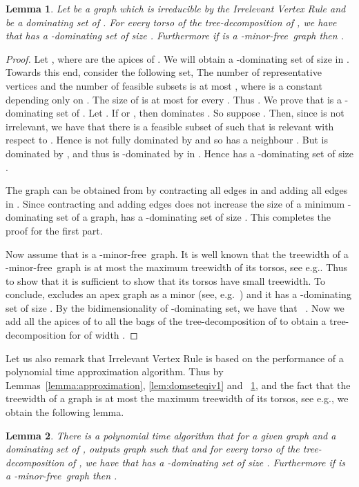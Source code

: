 \documentclass[11pt]{article}
\newtheorem{lemma}{Lemma}
\newcommand{\Hmf}{-minor-free}
\begin{document}
\begin{lemma}
\label{lem:dstwbound} Let  be a graph which is irreducible by the Irrelevant Vertex Rule and  be a dominating set of . 
For every torso  of the tree-decomposition  of , we have that  
has a -dominating set of size . Furthermore if  is a \Hmf \, graph then . 
\end{lemma}
\begin{proof}
Let , where  are the apices of . We will obtain a -dominating set of size  in . Towards this end, consider the following set,  
The number of   representative vertices  and the number of feasible subsets  
 is at most , where  is a constant depending only on . The size of  is at most  for every . Thus  . We prove that  is a -dominating set of . Let . If  or , then  dominates . So suppose . Then, since  is not irrelevant, we have that  there is a feasible subset  of  such that  is relevant with respect to . Hence  is not fully dominated by  and so  has a neighbour . But  is dominated by , and thus  is -dominated by  in . Hence  has a -dominating set of size .

The graph  can be obtained from  by contracting all edges in  and adding all edges in . Since contracting and adding edges does  not increase the size of a minimum -dominating set of a graph,  has a -dominating set of size . This completes the proof for the first part.

Now assume that  is a \Hmf \, graph. It is well known  that the treewidth of a \Hmf \, graph is at most the maximum treewidth of its torsos, see e.g.\cite{DemaineFHT05sub}. Thus to show that  it is sufficient to show that its torsos have small treewidth.  To conclude,  excludes an apex graph as a minor  (see, e.g.~\cite[Theorem ]{Grohe03}) and it has a -dominating set of size . By the bidimensionality of -dominating set, we have that ~\cite{DemaineFHT05sub,FominGT09con}. Now we add all the apices of  to all the bags of the tree-decomposition  of  to obtain a tree-decomposition for  of width   .  
\end{proof}

Let us also remark that Irrelevant Vertex Rule is based on the performance of a polynomial time approximation algorithm. Thus by 
Lemmas~\ref{lemma:approximation}, \ref{lem:domseteqiv1} and ~\ref{lem:dstwbound}, and the fact that the treewidth of a graph is at most the maximum treewidth of its torsos, see e.g.\cite{DemaineFHT05sub}, we obtain the following lemma.
\begin{lemma}
\label{lem:sumreductiondomset}
There is a polynomial time algorithm that for  a given graph  and a dominating set  of , outputs graph  such that  and for every torso  of the tree-decomposition  of , we have that  has a -dominating set of size . Furthermore if  is a \Hmf \, graph then . 
\end{lemma}
\end{document}
